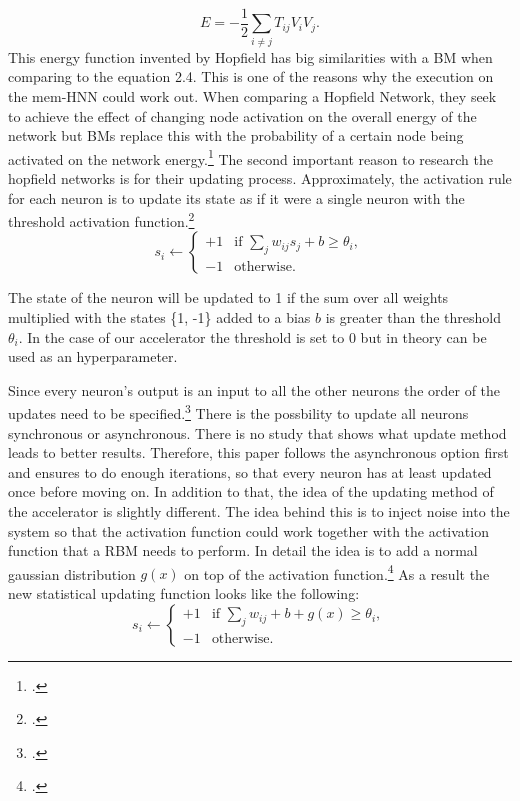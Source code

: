 \begin{equation}
    E = -\frac{1}{2} \sum_{i \neq j} T_{ij} V_i V_j .
\end{equation}
This energy function invented by Hopfield has big similarities with a \ac{BM} when comparing to the
equation 2.4. This is one of the reasons why the execution on the \ac{mem-HNN} could work out.
When comparing a Hopfield Network, they seek to achieve the effect of changing node activation on the overall energy of the network but \ac{BM}s replace this with the probability of a certain node being activated on the network energy.\footcite[cf.][7]{ahadNeuralNetworksWireless2016}
The second important reason to research the hopfield networks is for their updating process.
Approximately, the activation rule for each neuron is to update its state as if it were a single neuron with the threshold activation function.\footcite[cf.][506]{mackayInformationTheoryInference2003}
\[
s_i \leftarrow 
\begin{cases} 
+1 & \text{if } \sum_j w_{ij} s_j + b \geq \theta_i, \\
-1 & \text{otherwise}.
\end{cases}
\]

The state of the neuron will be updated to 1 if the sum over all weights multiplied with the states \{1, -1\} added to a bias \( b \)  is greater than the threshold \( \theta_i \).
In the case of our accelerator the threshold is set to 0 but in theory can be used as an hyperparameter.

Since every neuron's output is an input to all the other neurons the order of the updates need to be specified.\footcite[cf.][506]{mackayInformationTheoryInference2003}
There is the possbility to update all neurons synchronous or asynchronous. 
There is no study that shows what update method leads to better results.
Therefore, this paper follows the asynchronous option first and ensures to do enough iterations, so that every neuron has at least updated once before moving on. 
In addition to that, the idea of the updating method of the accelerator is slightly different. The idea behind this is to inject noise into the system so that the activation function could work together with the activation function that a \ac{RBM} needs to perform. 
In detail the idea is to add a normal gaussian distribution \( g(x) \) on top of the activation function.\footcite[cf.][4-5]{bohmNoiseinjectedAnalogIsing2022}
As a result the new statistical updating function looks like the following:
\[
s_i \leftarrow 
\begin{cases} 
+1 & \text{if } \sum_j w_{ij}  + b + g(x) \geq \theta_i, \\
-1 & \text{otherwise}.
\end{cases}
\]

